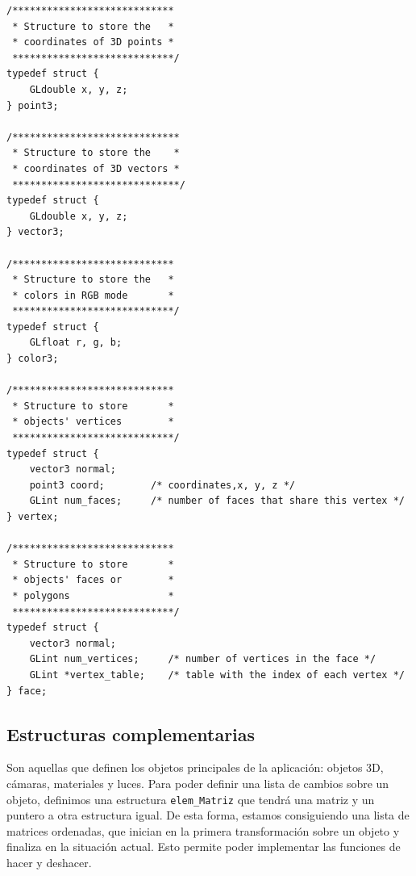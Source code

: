\documentclass[12pt,a4paper]{article}
\begin{document}
\begin{lstlisting}
/****************************
 * Structure to store the   *
 * coordinates of 3D points *
 ****************************/
typedef struct {
    GLdouble x, y, z;
} point3;

/*****************************
 * Structure to store the    *
 * coordinates of 3D vectors *
 *****************************/
typedef struct {
    GLdouble x, y, z;
} vector3;

/****************************
 * Structure to store the   *
 * colors in RGB mode       *
 ****************************/
typedef struct {
    GLfloat r, g, b;
} color3;

/****************************
 * Structure to store       *
 * objects' vertices        *
 ****************************/
typedef struct {
    vector3 normal;
    point3 coord;        /* coordinates,x, y, z */
    GLint num_faces;     /* number of faces that share this vertex */
} vertex;

/****************************
 * Structure to store       *
 * objects' faces or        *
 * polygons                 *
 ****************************/
typedef struct {
    vector3 normal;
    GLint num_vertices;     /* number of vertices in the face */
    GLint *vertex_table;    /* table with the index of each vertex */
} face;

\end{lstlisting}


\newpage
\subsection{Estructuras complementarias}

Son aquellas que definen los objetos principales de la aplicación: objetos 3D,  cámaras,  materiales y luces.  Para poder definir una lista de cambios sobre un objeto,  definimos una estructura \texttt{elem\_Matriz} que tendrá una matriz y un puntero a otra estructura igual.  De esta forma,  estamos consiguiendo una lista de matrices ordenadas,  que inician en la primera transformación sobre un objeto y finaliza en la situación actual. Esto permite poder implementar las funciones de hacer y deshacer.
\end{document}
